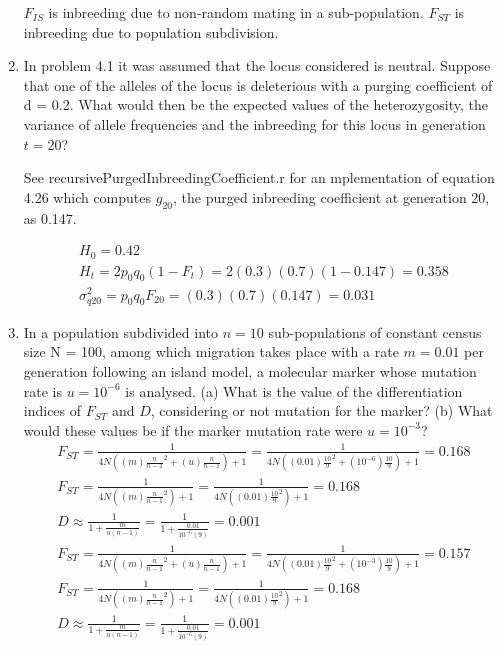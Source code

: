 \documentclass[12pt]{amsart}
\begin{document}
\begin{enumerate}
$F_{IS}$ is inbreeding due to non-random mating in a sub-population. $F_{ST}$ is inbreeding due to population subdivision.

\item In problem 4.1 it was assumed that the locus considered is neutral. Suppose that one of the alleles of the locus is deleterious with a purging coefficient of d = 0.2. What would then be the expected values of the heterozygosity, the variance of allele frequencies and the inbreeding for this locus in generation $t = 20$?

See recursivePurgedInbreedingCoefficient.r for an mplementation of equation 4.26 which computes $g_{20}$, the purged inbreeding coefficient at generation 20, as 0.147. 

\begin{gather*}
H_0 = 0.42 \\
H_t = 2p_0q_0(1-F_t) = 2(0.3)(0.7)(1 - 0.147) = 0.358\\
\sigma^2_{q20} = p_0q_0F_{20} = (0.3)(0.7)(0.147) = 0.031
\end{gather*}

\item In a population subdivided into $n = 10$ sub-populations of constant census size N = 100, among which migration takes place with a rate $m = 0.01$ per generation following an island model, a molecular marker whose mutation rate is $u = 10^{-6}$ is analysed. (a) What is the value of the differentiation indices of $F_{ST}$ and $D$, considering or not mutation for the marker? (b) What would these values be if the marker mutation rate were $u = 10^{-3}$? 
\begin{gather*}
F_{ST}  = \frac{1}{4N((m)\frac{n}{n-1}^2 + (u)\frac{n}{n-1}) + 1} = \frac{1}{4N((0.01)\frac{10}{9}^2 + (10^{-6})\frac{10}{9}) + 1} = 0.168 \\
F_{ST} =  \frac{1}{4N((m)\frac{n}{n-1}^2) + 1} = \frac{1}{4N((0.01)\frac{10}{9}^2)+ 1} = 0.168 \\
D \approx \frac{1}{1 + \frac{m}{u(n-1)}} = \frac{1}{1 + \frac{0.01}{10^{-6}(9)}} = 0.001\\
F_{ST}  = \frac{1}{4N((m)\frac{n}{n-1}^2 + (u)\frac{n}{n-1}) + 1} = \frac{1}{4N((0.01)\frac{10}{9}^2 + (10^{-3})\frac{10}{9}) + 1} = 0.157 \\
F_{ST} =  \frac{1}{4N((m)\frac{n}{n-1}^2) + 1} = \frac{1}{4N((0.01)\frac{10}{9}^2)+ 1} = 0.168 \\
D \approx \frac{1}{1 + \frac{m}{u(n-1)}} = \frac{1}{1 + \frac{0.01}{10^{-6}(9)}} = 0.001\\
\end{gather*}



\end{enumerate}
\end{document}
